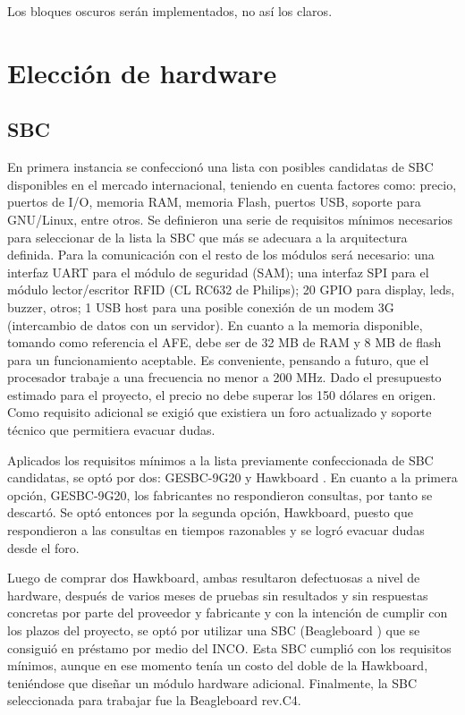 Los bloques oscuros serán implementados, no así los claros.


\newpage
\section{Elecci\'on de hardware}

\subsection{SBC}
En primera instancia se confeccionó una lista con posibles candidatas de SBC disponibles
en el mercado internacional, teniendo en cuenta factores como: precio, puertos de I/O, memoria RAM, memoria Flash, puertos USB, soporte para GNU/Linux, entre otros.
Se definieron una serie de requisitos mínimos necesarios para seleccionar de la lista la SBC que más se adecuara a la arquitectura definida.
Para la comunicación con el resto de los módulos será necesario: una interfaz UART para el módulo de seguridad (SAM); una interfaz SPI para el módulo lector/escritor RFID (CL RC632 de Philips); 20 GPIO para display, leds, buzzer, otros; 1 USB host para una posible conexión de un modem 3G (intercambio de datos con un servidor). En cuanto a la memoria disponible, tomando como referencia el AFE, debe ser de 32 MB de RAM y 8 MB de flash para un funcionamiento aceptable. Es conveniente, pensando a futuro, que el procesador trabaje a una frecuencia no menor a 200 MHz.
Dado el presupuesto estimado para el proyecto, el precio no debe superar los 150 dólares en origen.
Como requisito adicional se exigió que existiera un foro actualizado y soporte técnico que permitiera evacuar dudas.


Aplicados los requisitos mínimos a la lista previamente confeccionada de SBC candidatas, se optó por dos: GESBC-9G20 \cite{9G20} y Hawkboard \cite{Hawk}.
En cuanto a la primera opción, GESBC-9G20, los fabricantes no respondieron consultas, por tanto se descartó. Se optó entonces por la segunda opción, Hawkboard, puesto que respondieron a las consultas en tiempos razonables y se logró evacuar dudas desde el foro.


Luego de comprar dos Hawkboard, ambas resultaron defectuosas a nivel de hardware, después de varios meses de pruebas sin resultados y sin respuestas concretas por parte del proveedor y fabricante y con la intención de cumplir con los plazos del proyecto, se optó por utilizar una SBC (Beagleboard \cite{Beagle}) que se consiguió en préstamo por medio del INCO. Esta SBC cumplió con los requisitos mínimos, aunque en ese momento tenía un costo del doble de la Hawkboard, teniéndose que diseñar un módulo hardware adicional.
Finalmente, la SBC seleccionada para trabajar fue la Beagleboard rev.C4.

